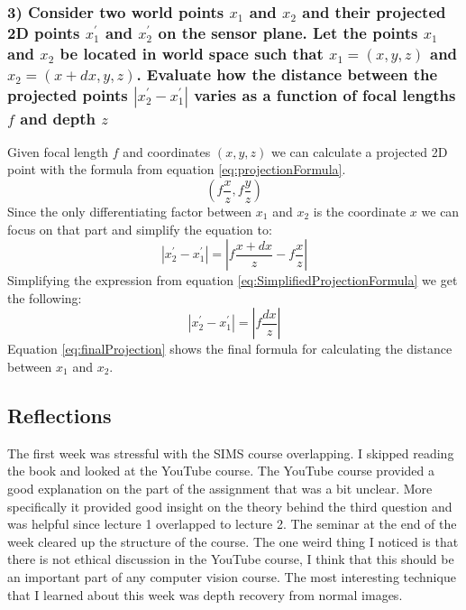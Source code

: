 \documentclass{article}
\begin{document}
    \subsubsection*{3)  Consider two world points $x_1$ and $x_2$ and their projected 2D points $x_1^\prime$ and $x_2^\prime$ on the sensor plane. Let the points $x_1$ and $x_2$ be located in world space such that $x_1=(x, y, z)$ and $x_2=(x+dx, y, z)$. Evaluate how the distance between the projected points  $|x_2^\prime - x_1^\prime|$ varies as a function of focal lengths $f$ and depth $z$}
    Given focal length $f$ and coordinates $(x, y, z)$ we can calculate a projected 2D point with the formula from equation \ref{eq:projectionFormula}.
    \begin{equation}
        \label{eq:projectionFormula}
        \left( f\frac{x}{z}, f\frac{y}{z} \right)
    \end{equation}
    Since the only differentiating factor between $x_1$ and $x_2$ is the coordinate $x$ we can focus on that part and simplify the equation to:
    \begin{equation}
        \label{eq:SimplifiedProjectionFormula}
        |x_2^\prime - x_1^\prime| = \left| f\frac{x+dx}{z} - f\frac{x}{z} \right|
    \end{equation}
    Simplifying the expression from equation \ref{eq:SimplifiedProjectionFormula} we get the following:
    \begin{equation}
        \label{eq:finalProjection}
        |x_2^\prime - x_1^\prime| = \left| f\frac{dx}{z} \right|
    \end{equation}
    Equation \ref{eq:finalProjection} shows the final formula for calculating the distance between $x_1$ and $x_2$.
    \subsection{Reflections}
    The first week was stressful with the SIMS course overlapping. 
    I skipped reading the book and looked at the YouTube course. 
    The YouTube course provided a good explanation on the part of the assignment that was a bit unclear. 
    More specifically it provided good insight on the theory behind the third question and was helpful since lecture 1 overlapped to lecture 2. 
    The seminar at the end of the week cleared up the structure of the course. 
    The one weird thing I noticed is that there is not ethical discussion in the YouTube course, 
    I think that this should be an important part of any computer vision course. 
    The most interesting technique that I learned about this week was depth recovery from normal images.
\end{document}

